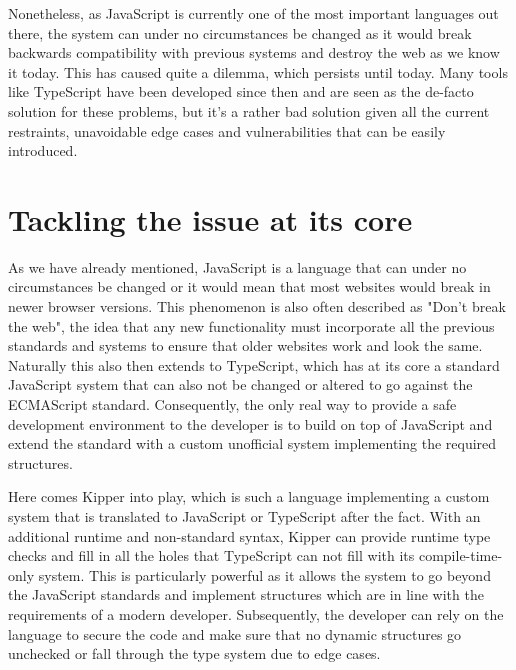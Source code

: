 Nonetheless, as JavaScript is currently one of the most important languages out there, the system can under no circumstances be changed as it would break backwards compatibility with previous systems and destroy the web as we know it today. This has caused quite a dilemma, which persists until today. Many tools like TypeScript have been developed since then and are seen as the de-facto solution for these problems, but it's a rather bad solution given all the current restraints, unavoidable edge cases and vulnerabilities that can be easily introduced.

\section{Tackling the issue at its core}

As we have already mentioned, JavaScript is a language that can under no circumstances be changed or it would mean that most websites would break in newer browser versions. This phenomenon is also often described as "Don't break the web", the idea that any new functionality must incorporate all the previous standards and systems to ensure that older websites work and look the same. Naturally this also then extends to TypeScript, which has at its core a standard JavaScript system that can also not be changed or altered to go against the ECMAScript standard. Consequently, the only real way to provide a safe development environment to the developer is to build on top of JavaScript and extend the standard with a custom unofficial system implementing the required structures.

Here comes Kipper into play, which is such a language implementing a custom system that is translated to JavaScript or TypeScript after the fact. With an additional runtime and non-standard syntax, Kipper can provide runtime type checks and fill in all the holes that TypeScript can not fill with its compile-time-only system. This is particularly powerful as it allows the system to go beyond the JavaScript standards and implement structures which are in line with the requirements of a modern developer. Subsequently, the developer can rely on the language to secure the code and make sure that no dynamic structures go unchecked or fall through the type system due to edge cases.
